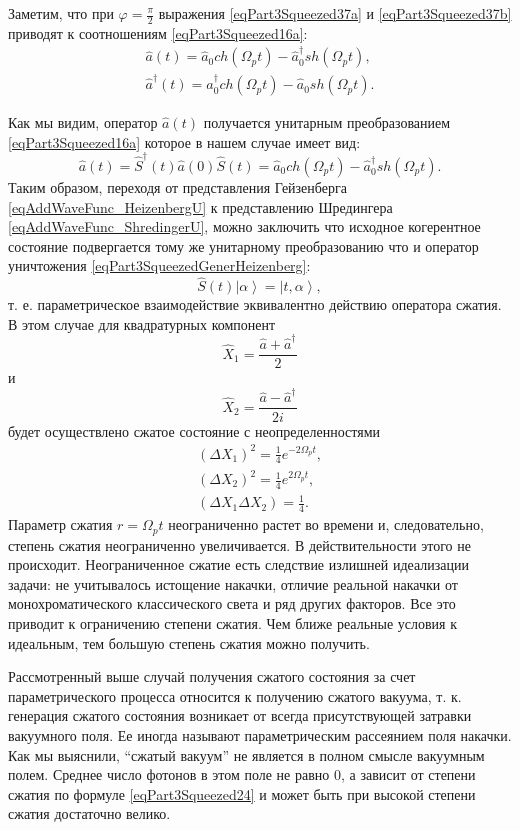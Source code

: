 Заметим, что при $\varphi = \frac{\pi}{2}$ выражения
\eqref{eqPart3Squeezed37a} и \eqref{eqPart3Squeezed37b} приводят к
соотношениям
\eqref{eqPart3Squeezed16a}:
\begin{eqnarray}
\hat{a}\left(t\right) = \hat{a}_0 ch \left(\Omega_p t \right) - 
\hat{a}^{\dag}_0 sh \left(\Omega_p t\right),
\nonumber \\
\hat{a}^{\dag}\left(t\right) = \hat{a}^{\dag}_0 ch \left(\Omega_p t \right) -
\hat{a}_0 sh \left(\Omega_p t\right).
\nonumber
\end{eqnarray}

Как мы видим, оператор $\hat{a}\left(t\right)$ получается унитарным
преобразованием \eqref{eqPart3Squeezed16a} которое в нашем случае
имеет вид:
\begin{equation}
\hat{a}\left(t\right) =
\hat{S}^{\dag}\left(t\right)
\hat{a}\left(0\right)
\hat{S}\left(t\right) =
\hat{a}_0 ch \left(\Omega_p t \right) - 
\hat{a}^{\dag}_0 sh \left(\Omega_p t\right).
\label{eqPart3SqueezedGenerHeizenberg}
\end{equation}
Таким образом, переходя от представления Гейзенберга
\eqref{eqAddWaveFunc_HeizenbergU}
к представлению Шредингера \eqref{eqAddWaveFunc_ShredingerU}, можно
заключить что исходное когерентное состояние подвергается тому же
унитарному преобразованию что и оператор уничтожения
\eqref{eqPart3SqueezedGenerHeizenberg}:
\begin{equation}
\hat{S}\left(t\right)
\left|\alpha\right> =
\left|t, \alpha\right>,
\nonumber
\end{equation}
т. е. параметрическое взаимодействие эквивалентно действию оператора
сжатия. В этом случае для
квадратурных компонент 
\[
\hat{X}_1 = \frac{\hat{a} + \hat{a}^{\dag}}{2}
\]
и
\[
\hat{X}_2 = \frac{\hat{a} - \hat{a}^{\dag}}{2i}
\]
будет осуществлено сжатое состояние с неопределенностями 
\begin{eqnarray}
\left(\Delta X_1\right)^2 = 
\frac{1}{4}e^{-2 \Omega_p t},
\nonumber \\
\left(\Delta X_2\right)^2 = 
\frac{1}{4}e^{2 \Omega_p t},
\nonumber \\
\left(\Delta X_1 \Delta X_2\right) = 
\frac{1}{4}.
\nonumber
\end{eqnarray}
Параметр сжатия $r = \Omega_p t$ неограниченно растет во времени и,
следовательно, степень сжатия неограниченно увеличивается. В
действительности этого не происходит. Неограниченное сжатие есть
следствие излишней идеализации задачи: не учитывалось истощение
накачки, отличие реальной накачки от монохроматического классического
света и ряд других факторов. Все это приводит к ограничению степени
сжатия. Чем ближе реальные условия к идеальным, тем большую степень
сжатия можно получить. 

Рассмотренный выше случай получения сжатого состояния за счет
параметрического процесса относится к получению сжатого вакуума,
т. к. генерация сжатого состояния возникает от всегда присутствующей
затравки вакуумного поля. Ее иногда называют параметрическим
рассеянием поля накачки. Как мы выяснили, ``сжатый вакуум'' не является
в полном смысле вакуумным полем. Среднее число фотонов в этом поле не
равно 0, а зависит от степени сжатия по формуле
\eqref{eqPart3Squeezed24} и может быть при 
высокой степени сжатия достаточно велико.

